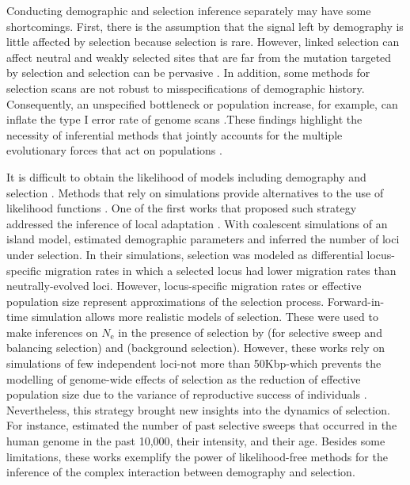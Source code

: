 \documentclass[a4paper, 12pt]{article}
\begin{document}
Conducting demographic and selection inference separately may have some shortcomings. First, there is the assumption that the signal left by demography is little affected by selection because selection is rare. However, linked selection can affect neutral and weakly selected sites that are far from the mutation targeted by selection \citep{Sella:2009hs, Neher:2013ju} and selection can be pervasive \citep{Sella:2009hs, Lange:2018fl}. In addition, some methods for selection scans are not robust to misspecifications of demographic history. Consequently, an unspecified bottleneck or population increase, for example, can inflate the type I error rate of genome scans \citep{Jensen:2005ky, Jensen:2007jw, Schrider:2016gg}.These findings highlight the necessity of inferential methods that jointly accounts for the multiple evolutionary forces that act on populations \citep{Lin:2011jv, Li:2012bh, Bank:2014hx}. 
 
It is difficult to obtain the likelihood of models including demography and selection \citep[but see][]{Vitalis:2014ja}. Methods that rely on simulations provide alternatives to the use of likelihood functions \citep{Csillery:2010jd, Schrider:2018ei}. One of the first works that proposed such strategy addressed the inference of local adaptation \citep{Bazin:2010dv}. With coalescent simulations of an island model, \citet{Bazin:2010dv} estimated demographic parameters and inferred the number of loci under selection. In their simulations, selection was modeled as differential locus-specific migration rates in which a selected locus had lower migration rates than neutrally-evolved loci. However, locus-specific migration rates or effective population size \citep[as in][]{Roux:2016gm, Fraisse:2021gg} represent approximations of the selection process. Forward-in-time simulation allows more realistic models of selection. These were used to make inferences on $N_\mathrm{e}$ in the presence of selection by \citet{Sheehan:2016caa} (for selective sweep and balancing selection) and \citet{Johri:2020ee} (background selection). However, these works rely on simulations of few independent loci-not more than 50Kbp-which prevents the modelling of genome-wide effects of selection as the reduction of effective population size due to the variance of reproductive success of individuals \citep[e.g.][]{Santiago:1995wx}. Nevertheless, this strategy brought new insights into the dynamics of selection. For instance, \citet{Laval:2019jo} estimated the number of past selective sweeps that occurred in the human genome in the past 10,000, their intensity, and their age. Besides some limitations, these works exemplify the power of likelihood-free methods for the inference of the complex interaction between demography and selection.
\end{document}
